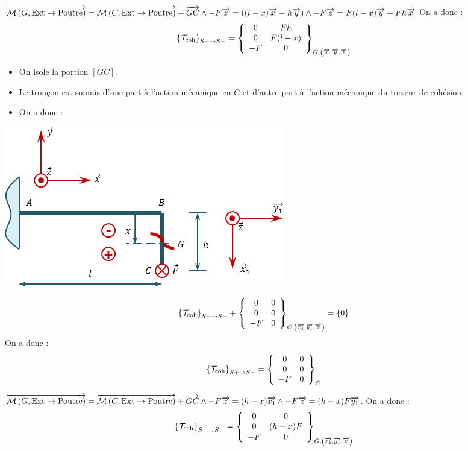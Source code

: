\documentclass[10pt,fleqn]{article} %
\begin{document}
\begin{multicols}{1}
\begin{corrige}
$\vectm{G}{\text{Ext}}{\text{Poutre}}
=\vectm{C}{\text{Ext}}{\text{Poutre}} + \vect{GC}\wedge -F \vect{z}  
= \left( (l-x) \vect{x} - h\vect{y} \right) \wedge -F \vect{z}
= F(l-x) \vect{y} +F h\vect{x} 
$
On a donc :
$$
\torseurscoh_{S+\rightarrow S-}
=\torseurcol{0}{0}{-F}{Fh}{F(l-x)}{0}{G,\left( \vect{x},\vect{y},\vect{z} \right)}
$$


\begin{minipage}[c]{.45\linewidth}
\begin{itemize}[label=,font=\color{ocre}] 
\item On isole la portion $[GC]$.
\item Le tronçon est soumis d'une part à l'action mécanique en $C$ et d'autre part à l'action mécanique du torseur de cohésion.
\item On a donc :
\end{itemize}
\end{minipage}\hfill
\begin{minipage}[c]{.45\linewidth}
\begin{center}
\includegraphics[width=.8\linewidth]{images/exo_02_corr_02}
\end{center}
\end{minipage}
$$
\torseurscoh_{S-\rightarrow S+} + \torseurcol{0}{0}{-F}{0}{0}{0}{C,\left( \vect{x_1},\vect{y_1},\vect{z} \right)} = \{0\}
$$
On a donc :
$$
\torseurscoh_{S+\rightarrow S-}
=\torseurcol{0}{0}{-F}{0}{0}{0}{C}
$$

$\vectm{G}{\text{Ext}}{\text{Poutre}}
=\vectm{C}{\text{Ext}}{\text{Poutre}} + \vect{GC}\wedge -F \vect{z}  
=  (h-x) \vect{x_1}  \wedge -F \vect{z}
=  (h-x) F \vect{y_1}
$. 
On a donc :
$$
\torseurscoh_{S+\rightarrow S-}
=\torseurcol{0}{0}{-F}{0}{(h-x) F}{0}{G,\left( \vect{x_1},\vect{y_1},\vect{z} \right)}
$$



\end{corrige}
\else 
\fi


\end{multicols}
\end{document}
